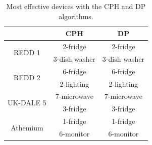 \begin{table}
\caption{Most effective devices with the CPH and DP algorithms.}\label{table:SR7}
\begin{center}
\begin{tabular}{|c|c|c|}
\hline
 & CPH & DP \\
 \hline
  \multirow{2}{*}{REDD 1} &2-fridge & 2-fridge \\
 & 3-dish washer & 3-dish washer  \\
 \hline
  \multirow{2}{*}{REDD 2} & 6-fridge & 6-fridge \\
 & 2-lighting & 2-lighting  \\
 \hline
  \multirow{2}{*}{UK-DALE 5} & 7-microwave & 7-microwave\\
  & 3-fridge &3-fridge \\
 \hline
  \multirow{2}{*}{Athemium} & 1-fridge & 1-fridge  \\
 & 6-monitor & 6-monitor  \\
 \hline
\end{tabular}
\end{center}
\end{table}

